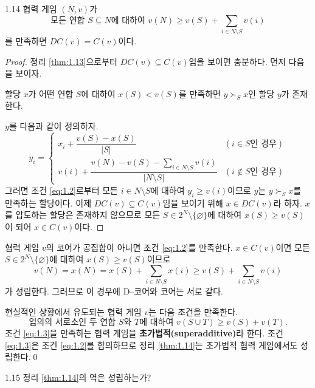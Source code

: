 \documentclass{article}
\numberwithin{equation}{section}
\begin{document}
\begin{thm}{}{1.14}
	협력 게임 $(N,v)$가
	\begin{equation}
		\label{eq:1.2}
		\text{모든 연합 }S\subseteq N\text{에 대하여 }v(N)\geq v(S)+\sum_{i\in N\setminus S}v(i)
	\end{equation}
	를 만족하면 $DC(v)=C(v)$이다.
\end{thm}

\begin{proof}
	정리 \ref{thm:1.13}으로부터 $DC(v)\subseteq C(v)$임을 보이면 충분하다. 먼저 다음을 보이자.
	\begin{lemma*}{}{}
  	할당 $x$가 어떤 연합 $S$에 대하여 $x(S)<v(S)$를 만족하면 $y\succ_Sx$인 할당 $y$가 존재한다.
	\end{lemma*}
	$y$를 다음과 같이 정의하자.
	\[
		y_i=\begin{cases}
			x_i+\dfrac{v(S)-x(S)}{\vert S\vert} & (i\in S\text{인 경우})\\[9pt]
			v(i)+\dfrac{v(N)-v(S)-\sum_{i\in N\setminus S}v(i)}{\vert N\setminus S\vert} & (i\notin S\text{인 경우})
		\end{cases}
	\]
	그러면 조건 \ref{eq:1.2}로부터 모든 $i\in N\setminus S$에 대하여 $y_i\geq v(i)$이므로 $y$는 $y\succ_Sx$를 만족하는 할당이다. 이제 $DC(v)\subseteq C(v)$임을 보이기 위해 $x\in DC(v)$라 하자. $x$를 압도하는 할당은 존재하지 않으므로 모든 $S\in 2^N\setminus\{\varnothing\}$에 대하여 $x(S)\geq v(S)$이 되어 $x\in C(v)$이다.
\end{proof}

\begin{remark}
  협력 게임 $v$의 코어가 공집합이 아니면 조건 \ref{eq:1.2}를 만족한다. $x\in C(v)$이면 모든 $S\in 2^N\setminus\{\varnothing\}$에 대하여 $x(S)\geq v(S)$이므로
  \[
  	v(N)=x(N)=x(S)+\sum_{i\in N\setminus S}x(i)\geq v(S)+\sum_{i\in N\setminus S}v(i)
  \]
  가 성립한다. 그러므로 이 경우에 D--코어와 코어는 서로 같다.
\end{remark}

현실적인 상황에서 유도되는 협력 게임 $v$는 다음 조건을 만족한다.
\begin{equation}
	\label{eq:1.3}
	\text{임의의 서로소인 두 연합 }S\text{와 }T\text{에 대하여 }v(S\cup T)\geq v(S)+v(T).
\end{equation}
조건 \ref{eq:1.3}을 만족하는 협력 게임을 \textbf{초가법적(superadditive)}라 한다. 조건 \ref{eq:1.3}은 조건 \ref{eq:1.2}를 함의하므로 정리 \ref{thm:1.14}는 초가법적 협력 게임에서도 성립한다.\qed

\begin{prob}{}{1.15}
  정리 \ref{thm:1.14}의 역은 성립하는가?
\end{prob}
\end{document}
